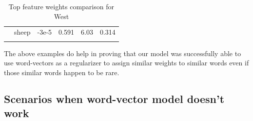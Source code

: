 \begin{table}[htbp]
\begin{tabular}{llllll}
\multicolumn{1}{l|}{}                     & \multicolumn{1}{l|}{sheep}  & \multicolumn{1}{l|}{-3e-5}                                                               & \multicolumn{1}{l|}{0.591}               & \multicolumn{1}{l|}{6.03}               & 0.314                                                         \\
                                          &                             &                                                                                         &                                          &                                         &                                                              
\end{tabular}
\caption{\label{tab:widgets}Top feature weights comparison for West}
\end{table}

The above examples do help in proving that our model was successfully able to use word-vectors as a regularizer to assign similar weights to similar words even if those similar words happen to be rare.

\newpage
\subsection{Scenarios when word-vector model doesn't work}

